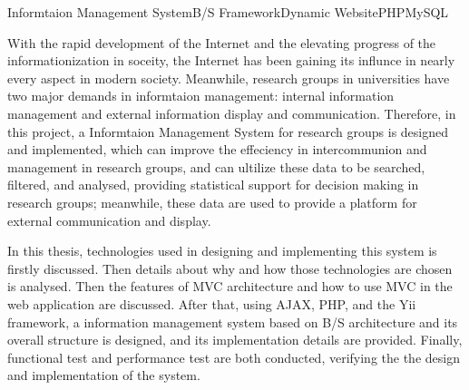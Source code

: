 


\begin{Eabstract}{Informtaion Management System}{B/S Framework}{Dynamic Website}{PHP}{MySQL}

With the rapid development of the Internet and the elevating progress of the informationization in soceity, the Internet has been gaining its influnce in nearly every aspect in modern society. Meanwhile, research groups in universities have two major demands in informtaion management: internal information management and external information display and communication. Therefore, in this project, a Informtaion Management System for research groups is designed and implemented, which can improve the effeciency in intercommunion and management in research groups, and can ultilize these data to be searched, filtered, and analysed, providing statistical support for decision making in research groups; meanwhile, these data are used to provide a platform for external communication and display.

In this thesis, technologies used in designing and implementing this system is firstly discussed. Then details about why and how those technologies are chosen is analysed. Then the features of MVC architecture
and how to use MVC in the web application are discussed. After that, using AJAX, PHP, and the Yii framework, a information management system based on B/S architecture and its overall structure is designed, and its implementation details are provided. Finally,  functional test and performance test are both conducted, verifying the the design and implementation of the system.
\end{Eabstract}
